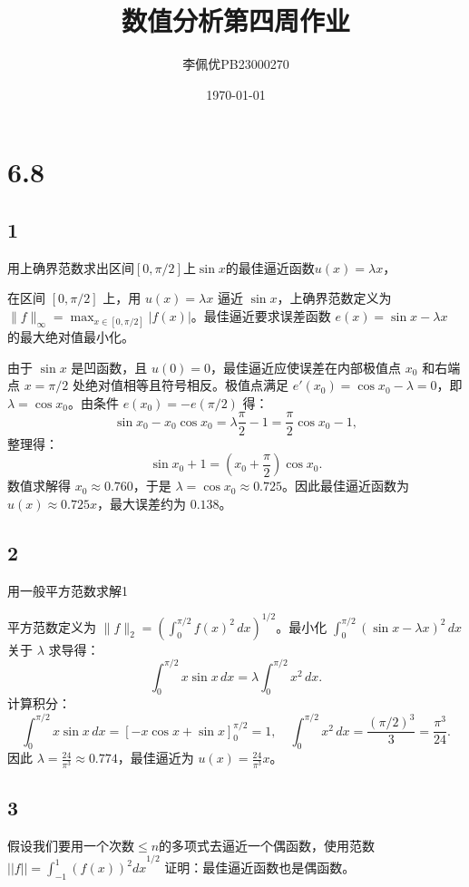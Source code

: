 \documentclass{article}
\title{数值分析第四周作业}
\date{\today}
\author{李佩优PB23000270}
\begin{document}
\maketitle
\section*{6.8}

\subsection*{1}
用上确界范数求出区间$[0,\pi/2]$上$\sin x $的最佳逼近函数$u(x)=\lambda x$，


在区间 \([0, \pi/2]\) 上，用 \(u(x) = \lambda x\) 逼近 \(\sin x\)，上确界范数定义为 \(\|f\|_\infty = \max_{x \in [0, \pi/2]} |f(x)|\)。最佳逼近要求误差函数 \(e(x) = \sin x - \lambda x\) 的最大绝对值最小化。

由于 \(\sin x\) 是凹函数，且 \(u(0)=0\)，最佳逼近应使误差在内部极值点 \(x_0\) 和右端点 \(x = \pi/2\) 处绝对值相等且符号相反。极值点满足 \(e'(x_0) = \cos x_0 - \lambda = 0\)，即 \(\lambda = \cos x_0\)。由条件 \(e(x_0) = -e(\pi/2)\) 得：
\[
\sin x_0 - x_0 \cos x_0 = \lambda \frac{\pi}{2} - 1 = \frac{\pi}{2} \cos x_0 - 1,
\]
整理得：
\[
\sin x_0 + 1 = \left( x_0 + \frac{\pi}{2} \right) \cos x_0.
\]
数值求解得 \(x_0 \approx 0.760\)，于是 \(\lambda = \cos x_0 \approx 0.725\)。因此最佳逼近函数为 \(u(x) \approx 0.725x\)，最大误差约为 \(0.138\)。

\subsection*{2}
用一般平方范数求解1

平方范数定义为 \(\|f\|_2 = \left( \int_0^{\pi/2} f(x)^2 \, dx \right)^{1/2}\)。最小化 \(\int_0^{\pi/2} (\sin x - \lambda x)^2 \, dx\) 关于 \(\lambda\) 求导得：
\[
\int_0^{\pi/2} x \sin x \, dx = \lambda \int_0^{\pi/2} x^2 \, dx.
\]
计算积分：
\[
\int_0^{\pi/2} x \sin x \, dx = \left[ -x \cos x + \sin x \right]_0^{\pi/2} = 1,
\quad
\int_0^{\pi/2} x^2 \, dx = \frac{(\pi/2)^3}{3} = \frac{\pi^3}{24}.
\]
因此 \(\lambda = \frac{24}{\pi^3} \approx 0.774\)，最佳逼近为 \(u(x) = \frac{24}{\pi^3} x\)。


\subsection*{3}
假设我们要用一个次数$\leqslant n$的多项式去逼近一个偶函数，使用范数
$||f||= {\int_{-1}^{1}(f(x))^2 dx}^{1/2}$
证明：最佳逼近函数也是偶函数。
\end{document}

